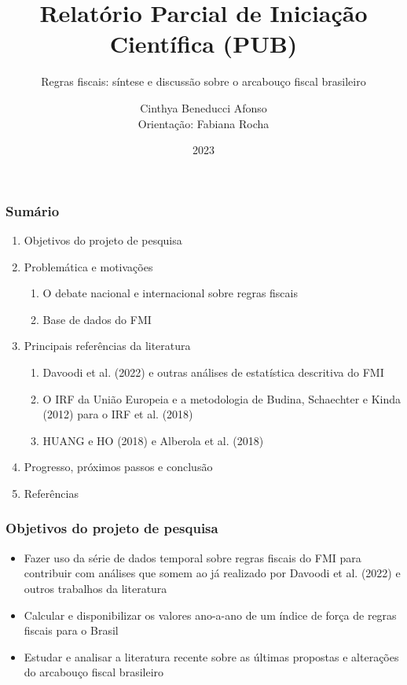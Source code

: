 \documentclass{beamer}
\begin{document}
\title{Relatório Parcial de Iniciação Científica (PUB)}
\subtitle{Regras fiscais: síntese e discussão sobre o arcabouço fiscal brasileiro}
\author{Cinthya Beneducci Afonso\\\small{Orientação: Fabiana Rocha}}
\date{2023}

\frame{\titlepage}

\begin{frame}
\frametitle{Sumário}

\begin{enumerate}
    \item Objetivos do projeto de pesquisa
    \item Problemática e motivações
    \begin{enumerate}
        \item O debate nacional e internacional sobre regras fiscais
        \item Base de dados do FMI
    \end{enumerate}
    \item Principais referências da literatura
    \begin{enumerate}
        \item Davoodi et al. (2022) e outras análises de estatística descritiva do FMI 
        \item O IRF da União Europeia e a metodologia de Budina, Schaechter e Kinda (2012) para o IRF et al. (2018) 
        \item HUANG e HO (2018) e Alberola et al. (2018)
    \end{enumerate}
    \item Progresso, próximos passos e conclusão
    \item Referências

\end{enumerate}

\end{frame}

\begin{frame}
\frametitle{Objetivos do projeto de pesquisa}
    \begin{itemize}
        \item Fazer uso da série de dados temporal sobre regras fiscais do FMI para contribuir com análises que somem ao já realizado por Davoodi et al. (2022) e outros trabalhos da literatura
        \item Calcular e disponibilizar os valores ano-a-ano de um índice de força de regras fiscais para o Brasil 
        \item Estudar e analisar a literatura recente sobre as últimas propostas e alterações do arcabouço fiscal brasileiro
    
    \end{itemize}
\end{frame}
\end{document}
